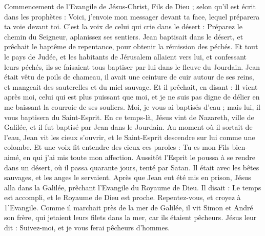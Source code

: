 \begin{multicols}{2}
\VerseOne{}Commencement de l'Evangile de Jésus-Christ, Fils de Dieu ;
selon qu'il est écrit dans les prophètes : Voici, j'envoie mon messager devant ta face, lequel préparera ta voie devant toi.
C’est la voix de celui qui crie dans le désert : Préparez le chemin du Seigneur, aplanissez ses sentiers{}.
Jean baptisait dans le désert, et prêchait le baptême de repentance, pour obtenir la rémission des péchés.
Et tout le pays de Judée, et les habitants de Jérusalem allaient vers lui, et confessant leurs péchés, ils se faisaient tous baptiser par lui dans le fleuve du Jourdain.
Jean était vêtu de poils de chameau, il avait une ceinture de cuir autour de ses reins, et mangeait des sauterelles et du miel sauvage.
Et il prêchait, en disant : Il vient après moi, celui qui est plus puissant que moi, et je ne suis pas digne de délier en me baissant la courroie de ses souliers.
Moi, je vous ai baptisés d'eau ; mais lui, il vous baptisera du Saint-Esprit.
En ce temps-là, Jésus vint de Nazareth, ville de Galilée, et il fut baptisé par Jean dans le Jourdain.
Au moment où il sortait de l'eau, Jean vit les cieux s’ouvrir, et le Saint-Esprit descendre sur lui comme une colombe.
Et une voix fit entendre des cieux ces paroles : Tu es mon Fils bien-aimé, en qui j'ai mis toute mon affection.
Aussitôt l'Esprit le poussa à se rendre dans un désert,
où il passa quarante jours, tenté par Satan. Il était avec les bêtes sauvages, et les anges le servaient.
Après que Jean eut été mis en prison, Jésus alla dans la Galilée, prêchant l'Evangile du Royaume de Dieu.
Il disait : Le temps est accompli, et le Royaume de Dieu est proche. Repentez-vous, et croyez à 1'Evangile.
Comme il marchait près de la mer de Galilée, il vit Simon et André son frère, qui jetaient leurs filets dans la mer, car ils étaient pêcheurs.
Jésus leur dit : Suivez-moi, et je vous ferai pêcheurs d'hommes.

\end{multicols}
